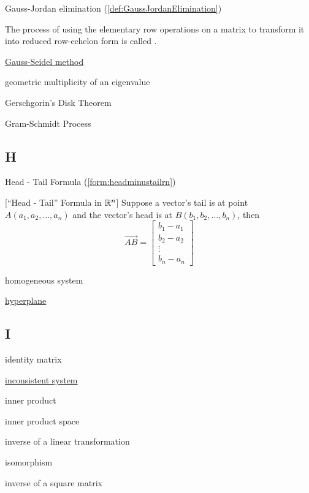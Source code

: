 \documentclass{ximera}
\begin{document}
Gauss-Jordan elimination (\ref{def:GaussJordanElimination})
\begin{expandable}
    The process of using the elementary row operations on a matrix to transform it into reduced row-echelon form is called .
\end{expandable}

\href{https://ximera.osu.edu/oerlinalg/LinearAlgebra/SYS-0040/main}{Gauss-Seidel method}

geometric multiplicity of an eigenvalue

Gerschgorin's Disk Theorem

Gram-Schmidt Process


\subsection{H}
Head - Tail Formula (\ref{form:headminustailrn})
\begin{expandable}
  [``Head - Tail'' Formula in $\mathbb{R}^n$]
Suppose a vector's tail is at point $A(a_1, a_2, \ldots ,a_n)$ and the vector's head is at $B(b_1, b_2, \ldots ,b_n)$, then 
$$\overrightarrow{AB}=\begin{bmatrix}b_1-a_1\\ b_2-a_2\\ \vdots \\b_n-a_n\end{bmatrix}$$

\end{expandable}

homogeneous system %

\href{https://ximera.osu.edu/oerlinalg/LinearAlgebra/RRN-0030/main}{hyperplane}

\subsection{I}

identity matrix

\href{https://ximera.osu.edu/oerlinalg/LinearAlgebra/SYS-0010/main}{inconsistent system}

inner product

inner product space

inverse of a linear transformation

isomorphism

inverse of a square matrix
\end{document}
